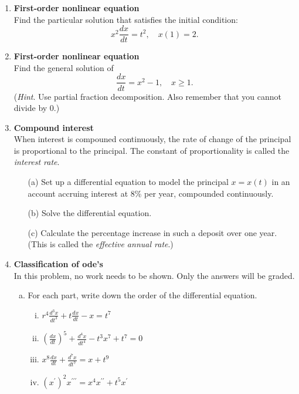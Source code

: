 \documentclass[12pt]{amsart}
\begin{document}
\begin{enumerate}[1.]
\setlength{\itemsep}{5mm}

\item  \textbf{First-order nonlinear equation}\\
  Find the particular solution that satisfies the initial condition:
  \[
    x^2 \frac{dx}{dt} = t^2, \quad x(1) =2.
    \]
    

 
\item  \textbf{First-order nonlinear equation} \\
  Find the general solution of
  \[
    \frac{dx}{dt} = x^2 -1, \quad x \ge 1.
  \]
  (\textit{Hint}.  Use partial fraction decomposition.  Also remember
  that you cannot divide by 0.)
  

  \item  \textbf{Compound interest} \\
    When interest is compouned continuously, the rate of change of the
    principal is proportional to the principal.
    The constant of proportionality is called the \textit{interest
      rate}.
    \begin{enumerate}
      \item[(a)] Set up a differential equation to model the principal
        $x=x(t)$ in an account accruing interest at 8\% per year,
        compounded continuously.
      \item[(b)] Solve the differential equation.
        \item[(c)] Calculate the percentage increase in such a deposit over one
          year. (This is called the \textit{effective annual rate}.)
          \end{enumerate}



        \item  \textbf{Classification of ode's}\\
          In this problem, no work needs to be shown.  Only the
          answers will be graded.  
          \medskip
          
          \begin{enumerate}[(a)]
     \item   For each part, write down the order of the differential equation.
    \begin{enumerate}[(i)]
        \item $\displaystyle r^4\frac{d^3x}{dt^3} + t\frac{dx}{dt} - x = t^7$
        \item $\displaystyle \left (\frac{dx}{dt} \right)^5 + \frac{d^4x}{dt^4} -t^3x^7 + t^7 = 0$
        \item $\displaystyle x^8\frac{dx}{dt} + \frac{d^7x}{dt^7} = x + t^9$
        \item $\displaystyle \left ( x^{\prime} \right )^2x^{\prime\prime\prime} = x^4x^{\prime\prime} + t^5x^{\prime}$
        \end{enumerate}


\end{enumerate}
\end{enumerate}
\end{document}
